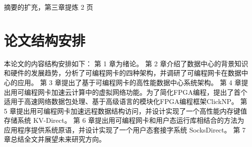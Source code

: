 摘要的扩充，第三章提炼 2 页

\section{论文结构安排}

本论⽂的内容结构安排如下：
第 1 章为绪论。
第 2 章介绍了数据中心的背景知识和硬件的发展趋势，分析了可编程网卡的四种架构，并调研了可编程网卡在数据中心的应用。
第 3 章提出了基于可编程网卡的高性能数据中心系统架构。
第 4 章提出用可编程网卡加速云计算中的虚拟网络功能。为了简化FPGA编程，提出了首个适用于高速网络数据包处理、基于高级语言的模块化FPGA编程框架ClickNP。
第 5 章提出用可编程网卡加速远程数据结构访问，并设计实现了一个高性能内存键值存储系统 KV-Direct。
第 6 章提出用可编程网卡和用户态运行库相结合的方法为应用程序提供系统原语，并设计实现了一个用户态套接字系统 SocksDirect。
第 7 章总结全⽂并展望未来研究方向。